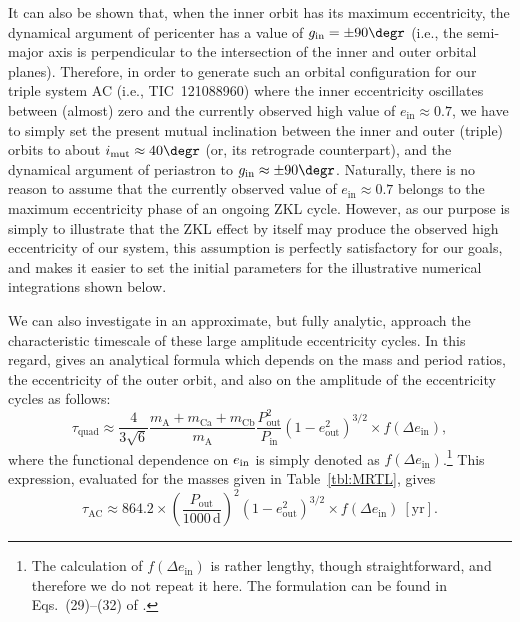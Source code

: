 \documentclass[fleqn,usenatbib]{mnras} %
\begin{document}
It can also be shown that, when the inner orbit has its maximum eccentricity, the dynamical argument of pericenter has a value of $g_\mathrm{in}=\pm90\degr$ (i.e., the semi-major axis is perpendicular to the intersection of the inner and outer orbital planes). Therefore, in order to generate such an orbital configuration for our triple system AC (i.e., TIC~121088960) where the inner eccentricity oscillates between (almost) zero and the currently observed high value of $e_\mathrm{in}\approx0.7$, we have to simply set the present mutual inclination between the inner and outer (triple) orbits to about $i_\mathrm{mut}\approx40\degr$ (or, its retrograde counterpart), and the dynamical argument of periastron to $g_\mathrm{in}\approx\pm90\degr$. Naturally, there is no reason to assume that the currently observed value of $e_\mathrm{in}\approx0.7$ belongs to the maximum eccentricity phase of an ongoing ZKL cycle.  However, as our purpose is simply to illustrate that the ZKL effect by itself may produce the observed high eccentricity of our system, this assumption is perfectly satisfactory for our goals, and makes it easier to set the initial parameters for the illustrative numerical integrations shown below.


We can also investigate in an approximate, but fully analytic, approach the characteristic timescale of these large amplitude eccentricity cycles.  In this regard, \citet{Soderhjelm1982} gives an analytical formula which depends on the mass and period ratios, the eccentricity of the outer orbit, and also on the amplitude of the eccentricity cycles as follows:
\begin{equation}
\tau_\mathrm{quad}\approx\frac{4}{3\sqrt6}\frac{m_\mathrm{A}+m_\mathrm{Ca}+m_\mathrm{Cb}}{m_\mathrm{A}}\frac{P_\mathrm{out}^2}{P_\mathrm{in}}\left(1-e_\mathrm{out}^2\right)^{3/2}\times f(\Delta e_\mathrm{in}),
\label{eq:ZKL_timescale}
\end{equation}
where the functional dependence on $e_{\rm in}$ is simply denoted as $f(\Delta e_\mathrm{in})$.\footnote{The calculation of $f(\Delta e_\mathrm{in})$ is rather lengthy, though straightforward, and therefore we do not repeat it here. The formulation can be found in Eqs.~(29)--(32) of \citet{Soderhjelm1982}.} This expression, evaluated for the masses given in Table~\ref{tbl:MRTL}, gives
\begin{equation}
\tau_\mathrm{AC}\approx864.2\times\left(\frac{P_\mathrm{out}}{1000\,\mathrm{d}}\right)^2\left(1-e_\mathrm{out}^2\right)^{3/2}\times f(\Delta e_\mathrm{in})~\mathrm{[yr]}.
\end{equation}
\end{document}
